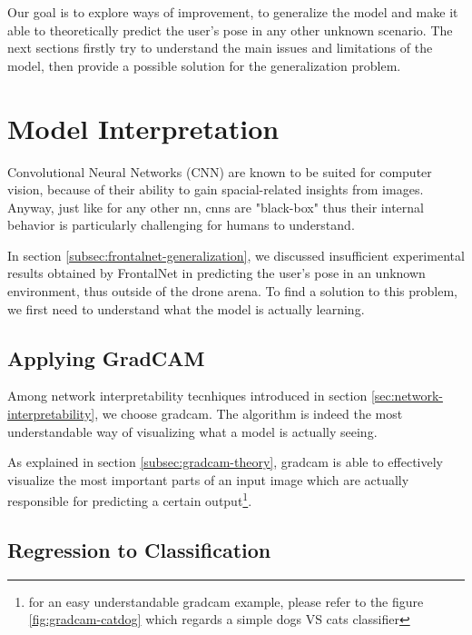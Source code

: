 Our goal is to explore ways of improvement, to generalize the model and make it able to theoretically predict the user's pose in any other unknown scenario. The next sections firstly try to understand the main issues and limitations of the model, then provide a possible solution for the generalization problem.




\section{Model Interpretation}
\label{sec:model-interpretration}


Convolutional Neural Networks (CNN) are known to be suited for computer vision, because of their ability to gain spacial-related insights from images. Anyway, just like for any other \gls{nn}, \gls{cnn}s are "black-box" thus their internal behavior is particularly challenging for humans to understand.

In section \ref{subsec:frontalnet-generalization}, we discussed insufficient experimental results obtained by FrontalNet in predicting the user's pose in an unknown environment, thus outside of the drone arena. To find a solution to this problem, we first need to understand what the model is actually learning.



\subsection{Applying GradCAM}
\label{subsec:gradcam-apply}


Among network interpretability tecnhiques introduced in section \ref{sec:network-interpretability}, we choose \gls{gradcam}. The algorithm is indeed the most understandable way of visualizing what a model is actually seeing.

As explained in section \ref{subsec:gradcam-theory}, \gls{gradcam} is able to effectively visualize the most important parts of an input image which are actually responsible for predicting a certain output\footnote{for an easy understandable \gls{gradcam} example, please refer to the figure \ref{fig:gradcam-catdog} which regards a simple dogs VS cats classifier}.



\subsection{Regression to Classification}
\label{subsec:gradcam-regrtoclass}

